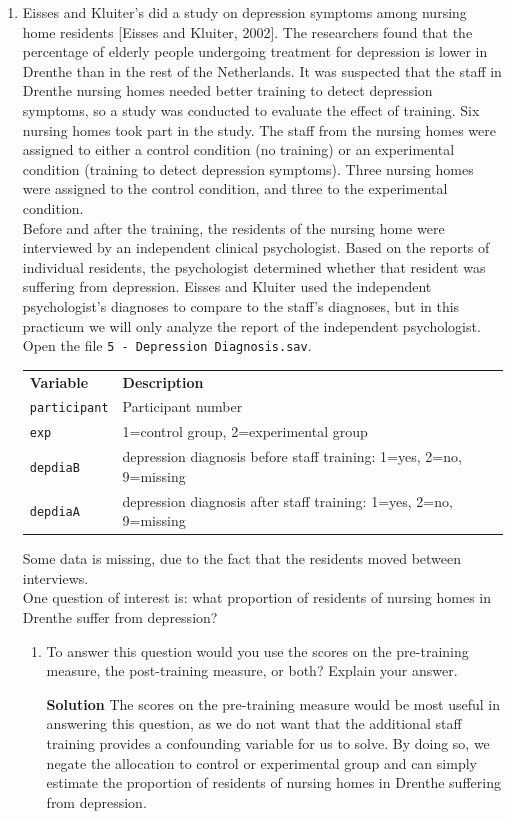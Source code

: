 \begin{enumerate}
    \item Eisses and Kluiter's did a study on depression symptoms among nursing home residents [Eisses and Kluiter, 2002]. The researchers found that the percentage of elderly people undergoing treatment for depression is lower in Drenthe than in the rest of the Netherlands. It was suspected that the staff in Drenthe nursing homes needed better training to detect depression symptoms, so a study was conducted to evaluate the effect of training. Six nursing homes took part in the study. The staff from the nursing homes were assigned to either a control condition (no training) or an experimental condition (training to detect depression symptoms). Three nursing homes were assigned to the control condition, and three to the experimental condition.
    \\
    Before and after the training, the residents of the nursing home were interviewed by an independent clinical psychologist. Based on the reports of individual residents, the psychologist determined whether that resident was suffering from depression. Eisses and Kluiter used the independent psychologist's diagnoses to compare to the staff's diagnoses, but in this practicum we will only analyze the report of the independent psychologist.
    \\
    Open the file \texttt{5 - Depression Diagnosis.sav}.
    \FloatBarrier
    \begin{table}[h]
    \centering
    \begin{tabular}{l|l}
    \textbf{Variable} & \textbf{Description} \\
    \texttt{participant} & Participant number \\
    \texttt{exp} & 1=control group, 2=experimental group \\
    \texttt{depdiaB} & depression diagnosis before staff training: 1=yes, 2=no, 9=missing \\
    \texttt{depdiaA} & depression diagnosis after staff training: 1=yes, 2=no, 9=missing
    \end{tabular}
    \end{table}
    \FloatBarrier
    Some data is missing, due to the fact that the residents moved between interviews.
    \\
    One question of interest is: what proportion of residents of nursing homes in Drenthe suffer from depression?
    \begin{enumerate}
        \item To answer this question would you use the scores on the pre-training measure, the post-training measure, or both? Explain your answer.
        \begin{framed}{\textbf{Solution}}
        The scores on the pre-training measure would be most useful in answering this question, as we do not want that the additional staff training provides a confounding variable for us to solve. By doing so, we negate the allocation to control or experimental group and can simply estimate the proportion of residents of nursing homes in Drenthe suffering from depression. 
        \end{framed}
        

\end{enumerate}
\end{enumerate}
